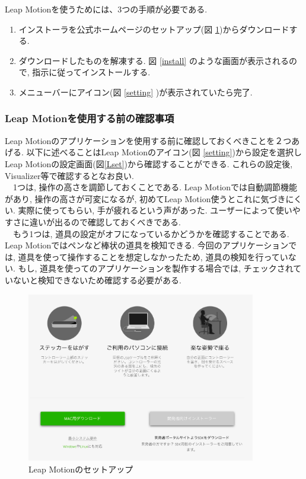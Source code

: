 \documentclass{funthesis}
\begin{document}


Leap Motionを使うためには、3つの手順が必要である. 
\begin{enumerate}
 \item インストーラを公式ホームページのセットアップ(図 \ref{setup})からダウンロードする.
 \item ダウンロードしたものを解凍する. 図 \ref{install} のような画面が表示されるので, 指示に従ってインストールする. 
 \item メニューバーにアイコン(図 \ref{setting} )が表示されていたら完了. 
\end{enumerate}

\subsubsection{Leap Motionを使用する前の確認事項}
Leap Motionのアプリケーションを使用する前に確認しておくべきことを２つあげる. 以下に述べることはLeap Motionのアイコン(図 \ref{setting})から設定を選択しLeap Motionの設定画面(図\ref{Lset})から確認することができる. これらの設定後, Visualizer等で確認するとなお良い. \\
　1つは, 操作の高さを調節しておくことである. Leap Motionでは自動調節機能があり, 操作の高さが可変になるが, 初めてLeap Motion使うとこれに気づきにくい. 実際に使ってもらい, 手が疲れるという声があった. ユーザーによって使いやすさに違いが出るので確認しておくべきである. \\
　もう1つは, 道具の設定がオフになっているかどうかを確認することである. Leap Motionではペンなど棒状の道具を検知できる. 今回のアプリケーションでは, 道具を使って操作することを想定しなかったため, 道具の検知を行っていない. もし, 道具を使ってのアプリケーションを製作する場合では, チェックされていないと検知できないため確認する必要がある. \\

\begin{figure}[H]
 \begin{center}
  \includegraphics[width=100mm]{./img/setup.png}
 \end{center}
 \caption{Leap Motionのセットアップ}
 \label{setup}
\end{figure}
\end{document}
